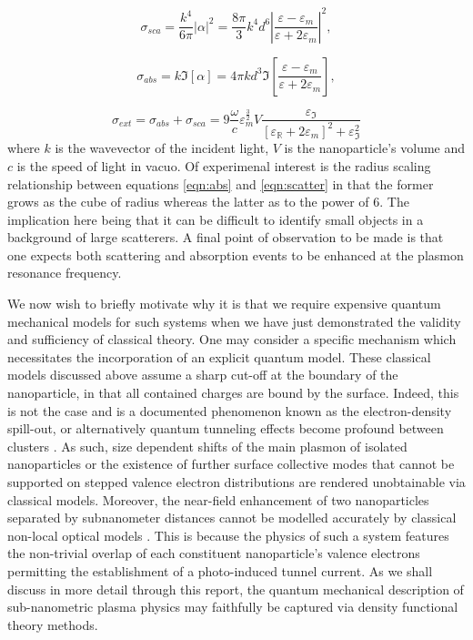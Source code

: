 \begin{equation}
    \sigma_{sca}  = \frac{k^{4}}{6\pi} |\alpha|^{2} = \frac{8\pi}{3}k^{4}d^{6} \left| \frac{\varepsilon - \varepsilon_{m}}{\varepsilon + 2\varepsilon_{m}} \right|^{2},
    \label{eqn:scatter}
\end{equation}

\begin{equation}
\sigma_{abs} = k\Im\left[\alpha\right] = 4\pi k d^{3}\Im\left[ \frac{\varepsilon - \varepsilon_{m}}{\varepsilon + 2\varepsilon_{m}} \right],
\label{eqn:abs}
\end{equation}

\begin{equation}
    \sigma_{ext} = \sigma_{abs} + \sigma_{sca} = 9\frac{\omega}{c}\varepsilon_{m}^{\frac{3}{2}}V \frac{\varepsilon_{\Im}}{\left[ \varepsilon_{\mathbb{R}} + 2\varepsilon_{m} \right]^{2} + \varepsilon_{\Im}^{2}}
    \label{eqn:extinction}
\end{equation}
where $k$ is the wavevector of the incident light, $V$ is the nanoparticle's volume and $c$ is the speed of light in vacuo. Of experimenal interest is the radius scaling relationship between equations \ref{eqn:abs} and \ref{eqn:scatter} in that the former grows as the cube of radius whereas the latter as to the power of 6. The implication here being that it can be difficult to identify small objects in a background of large scatterers. A final point of observation to be made is that one expects both scattering and absorption events to be enhanced at the plasmon resonance frequency.

We now wish to briefly motivate why it is that we require expensive quantum mechanical models for such systems when we have just demonstrated the validity and sufficiency of classical theory. One may consider a specific mechanism which necessitates the incorporation of an explicit quantum model. These classical models discussed above assume a sharp cut-off at the boundary of the nanoparticle, in that all contained charges are bound by the surface. Indeed, this is not the case and is a documented phenomenon known as the electron-density spill-out, or alternatively quantum tunneling effects become profound between clusters \cite{PlasmonTunneling}. As such, size dependent shifts of the main plasmon of isolated nanoparticles or the existence of further surface collective modes that cannot be supported on stepped valence electron distributions are rendered unobtainable via classical models. Moreover, the near-field enhancement of two nanoparticles separated by subnanometer distances cannot be modelled accurately by classical non-local optical models \cite{PlasmonTunneling2}. This is because the physics of such a system features the non-trivial overlap of each constituent nanoparticle's valence electrons permitting the establishment of a photo-induced tunnel current. As we shall discuss in more detail through this report, the quantum mechanical description of sub-nanometric plasma physics may faithfully be captured via density functional theory methods.

